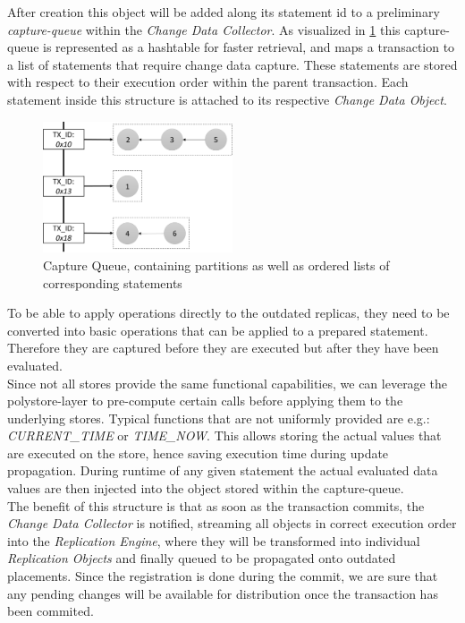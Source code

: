 After creation this object will be added along its statement id to a preliminary \emph{capture-queue} within the \emph{Change Data Collector}. 
As visualized in \ref{fig:hashtable} this capture-queue is represented as a hashtable for 
faster retrieval, and maps a transaction to a list of statements that require change data capture. 
These statements are stored with respect to their execution order within the parent transaction.
Each statement inside this structure is attached to its respective \emph{Change Data Object}.\\

\begin{figure}[t]
    \centering
    \includegraphics[width=0.5\textwidth]{Figures/hashtable.png}
    \caption{Capture Queue, containing partitions as well as ordered lists of corresponding statements}
    \label{fig:hashtable}
\end{figure}

To be able to apply operations directly to the outdated replicas, they need to be converted into basic operations that can be applied to a prepared statement.
Therefore they are captured before they are executed but after they have been evaluated.\\
Since not all stores provide the same functional capabilities, we can leverage the polystore-layer to pre-compute certain calls before applying them to the underlying stores.
Typical functions that are not uniformly provided are e.g.: \emph{CURRENT\_TIME} or \emph{TIME\_NOW}. This allows storing the actual values that are executed on the store,
hence saving execution time during update propagation.
During runtime of any given statement the actual evaluated data values are then injected into the object stored within the capture-queue.\\
The benefit of this structure is that as soon as the transaction commits, the \emph{Change Data Collector} is notified, streaming all objects in correct execution order
into the \emph{Replication Engine}, where they will be transformed into individual \emph{Replication Objects} and finally queued to be propagated onto outdated placements. 
Since the registration is done during the commit, we are sure that any pending changes will be available for distribution once the transaction has been commited.



